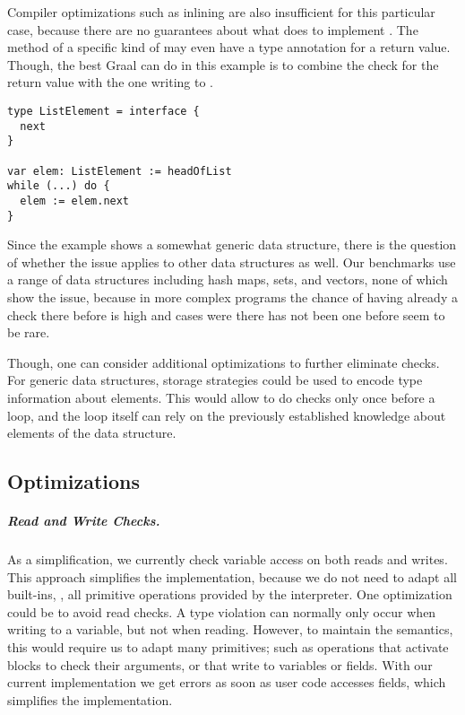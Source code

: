 Compiler optimizations such as inlining are also insufficient
for this particular case, because there are no guarantees about what
 does to implement .
The  method of a specific kind of  may even have
a type annotation for a return value.
Though, the best Graal can do in this example is to combine the check for the
return value with the one writing to .

\begin{lstlisting}[caption={Example for dynamic type checks not corresponding to existing checks.},%
  escapechar=|,label={ex:pathological-case},%
  float,floatplacement=htb]
type ListElement = interface {
  next
}

var elem: ListElement := headOfList
while (...) do {
  elem := elem.next
}
\end{lstlisting}

Since the example shows a somewhat generic data structure,
there is the question of whether the issue applies to other data structures as
well.
Our benchmarks use a range of data structures including hash maps, sets,
and vectors, none of which show the issue, because in more complex programs
the chance of having already a check there before is high
and cases were there has not been one before seem to be rare.

Though, one can consider additional optimizations
to further eliminate checks.
For generic data structures, storage strategies\citep{Bolz2013}
could be used to encode type information about elements.
This would allow to do checks only once before a loop,
and the loop itself can rely on the previously established knowledge
about elements of the data structure.


\subsection{Optimizations}
\label{sec:discussion-opt}


\subparagraph{Read and Write Checks.}
\label{sec:discussion-read-write}

As a simplification, we currently check variable access
on both reads and writes.
This approach simplifies the implementation, because we do not need to
adapt all built-ins, \ie,
all primitive operations provided by the interpreter.
One optimization could be to avoid read checks.
A type violation can normally only occur when writing to a variable,
but not when reading.
However, to maintain the semantics, this would require us to adapt
many primitives; 
such as operations that activate blocks to check their arguments,
or that write to variables or fields.
With our current implementation
we get errors as soon as user code accesses fields,
which simplifies the implementation.

